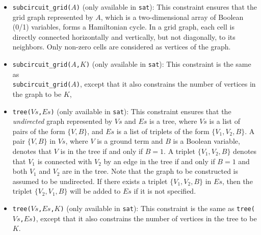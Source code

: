 \begin{itemize}
\item \texttt{subcircuit\_grid($A$)} (only available in \texttt{sat}): This constraint ensures that the grid graph represented by $A$, which is a two-dimensional array of Boolean (0/1) variables, forms a Hamiltonian cycle. In a grid graph, each cell is directly connected horizontally and vertically, but not diagonally, to its neighbors. Only non-zero cells are considered as vertices of the graph.

\item \texttt{subcircuit\_grid($A$,$K$)} (only available in \texttt{sat}): This constraint is the same as \\\texttt{subcircuit\_grid($A$)}, except that it also constrains the number of vertices in the graph to be $K$, 

\item \texttt{tree($Vs$,$Es$)} (only available in \texttt{sat}): This constraint ensures that the \textit{undirected} graph represented by $Vs$ and $Es$ is a tree, where $Vs$ is a list of pairs of the form $\{V,B\}$, and $Es$ is a list of triplets of the form $\{V_1,V_2,B\}$. A pair $\{V,B\}$ in $Vs$, where $V$ is a ground term and $B$ is a Boolean variable, denotes that $V$ is in the tree if and only if $B = 1$. A triplet $\{V_1,V_2,B\}$ denotes that $V_1$ is connected with $V_2$  by an edge in the tree if and only if $B = 1$ and both $V_1$ and $V_2$ are in the tree. Note that the graph to be constructed is assumed to be undirected. If there exists a triplet $\{V_1,V_2,B\}$ in $Es$, then the triplet $\{V_2,V_1,B\}$ will be added to $Es$ if it is not specified.

\item \texttt{tree($Vs$,$Es$,$K$)} (only available in \texttt{sat}):  This constraint is the same as \texttt{tree($Vs$,$Es$)}, except that it also constrains the number of vertices in the tree to be $K$. 
\end{itemize}

